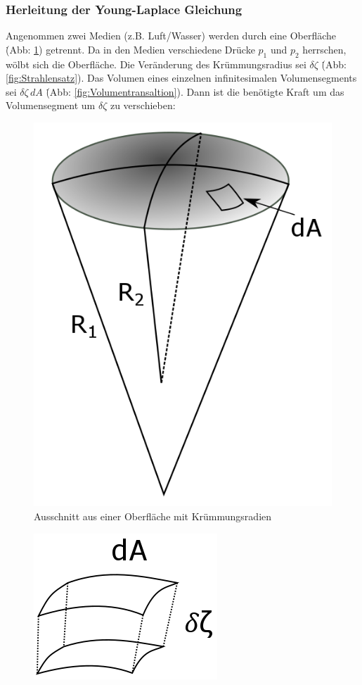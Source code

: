 \begin{refsection}
\subsubsection{Herleitung der Young-Laplace Gleichung}\label{YL-Herleitung}
Angenommen zwei Medien (z.B. Luft/Wasser) werden durch eine Oberfläche \. (Abb: \ref{fig:YoungCone}) getrennt. Da in den Medien verschiedene Drücke $p_1$ und $p_2$ herrschen, wölbt sich die Oberfläche. Die Veränderung des Krümmungsradius sei $\delta\zeta$ \.(Abb: \ref{fig:Strahlensatz}). Das Volumen eines einzelnen infinitesimalen Volumensegments sei $\delta\zeta\,dA$ \.(Abb: \ref{fig:Volumentransaltion}). Dann ist die benötigte Kraft um das Volumensegment um $\delta\zeta$ zu verschieben:
\begin{figure}
  \centering
  \includegraphics[scale=0.3]{minimal/YoungCone.png}
  \caption{Ausschnitt aus einer Oberfläche mit Krümmungsradien} 
  \label{fig:YoungCone}
\end{figure}
\begin{figure}
  \centering
  \includegraphics[scale=0.3]{minimal/Volumetranslation.png}

\end{figure}
\end{refsection}

